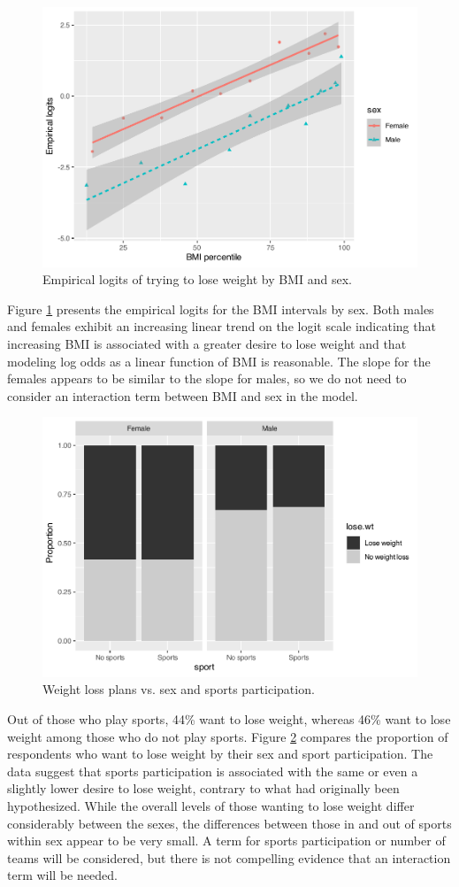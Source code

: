 \documentclass[
]{krantz}
\begin{document}
\begin{figure}

{\centering \includegraphics[width=0.6\linewidth]{bookdown-BeyondMLR_files/figure-latex/logitBMIsex-1} 

}

\caption{Empirical logits of trying to lose weight by BMI and sex.}\label{fig:logitBMIsex}
\end{figure}

Figure \ref{fig:logitBMIsex} presents the empirical logits for the BMI intervals by sex. Both males and females exhibit an increasing linear trend on the logit scale indicating that increasing BMI is associated with a greater desire to lose weight and that modeling log odds as a linear function of BMI is reasonable. The slope for the females appears to be similar to the slope for males, so we do not need to consider an interaction term between BMI and sex in the model.

\begin{figure}

{\centering \includegraphics[width=0.6\linewidth]{bookdown-BeyondMLR_files/figure-latex/mosaicsexsports-1} 

}

\caption{Weight loss plans vs. sex and sports participation.}\label{fig:mosaicsexsports}
\end{figure}

Out of those who play sports, 44\% want to lose weight, whereas 46\% want to lose weight among those who do not play sports. Figure \ref{fig:mosaicsexsports} compares the proportion of respondents who want to lose weight by their sex and sport participation. The data suggest that sports participation is associated with the same or even a slightly lower desire to lose weight, contrary to what had originally been hypothesized. While the overall levels of those wanting to lose weight differ considerably between the sexes, the differences between those in and out of sports within sex appear to be very small. A term for sports participation or number of teams will be considered, but there is not compelling evidence that an interaction term will be needed.
\end{document}
